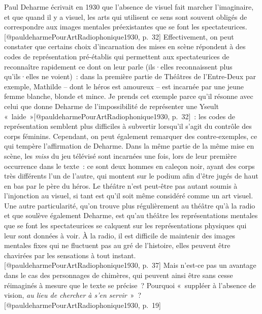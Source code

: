 \documentclass[
]{article}
\begin{document}
Paul Deharme écrivait en 1930 que l'absence de visuel fait marcher l'imaginaire, et que quand il y a visuel, les arts qui utilisent ce sens sont souvent obligés de correspondre aux images mentales préexistantes que se font les spectateurices.{[}@pauldeharmePourArtRadiophonique1930, p.~32{]} Effectivement, on peut constater que certains choix d'incarnation des mises en scène répondent à des codes de représentation pré-établis qui permettent aux spectateurices de reconnaître rapidement ce dont on leur parle (ils·elles reconnaissent plus qu'ils·elles ne voient)~: dans la première partie de Théâtres de l'Entre-Deux par exemple, Mathilde -- dont le héros est amoureux -- est incarnée par une jeune femme blanche, blonde et mince. Je prends cet exemple parce qu'il résonne avec celui que donne Deharme de l'impossibilité de représenter une Yseult «~laide~»{[}@pauldeharmePourArtRadiophonique1930, p.~32{]}~: les codes de représentation semblent plus difficiles à subvertir lorsqu'il s'agit du contrôle des corps féminins. Cependant, on peut également remarquer des contre-exemples, ce qui tempère l'affirmation de Deharme. Dans la même partie de la même mise en scène, les \emph{miss} du jeu télévisé sont incarnées une fois, lors de leur première occurrence dans le texte~: ce sont deux hommes en caleçon noir, ayant des corps très différents l'un de l'autre, qui montent sur le podium afin d'être jugés de haut en bas par le père du héros. Le théâtre n'est peut-être pas autant soumis à l'injonction au visuel, si tant est qu'il soit même considéré comme un art visuel. Une autre particularité, qu'on trouve plus régulièrement au théâtre qu'à la radio et que soulève également Deharme, est qu'au théâtre les représentations mentales que se font les spectateurices se calquent sur les représentations physiques qui leur sont données à voir. À la radio, il est difficile de maintenir des images mentales fixes qui ne fluctuent pas au gré de l'histoire, elles peuvent être chavirées par les sensations à tout instant.{[}@pauldeharmePourArtRadiophonique1930, p.~37{]} Mais n'est-ce pas un avantage dans le cas des personnages de chimères, qui peuvent ainsi être sans cesse réimaginés à mesure que le texte se précise~? Pourquoi «~suppléer à l'absence de vision, \emph{au lieu de chercher à s'en servir}~»~?{[}@pauldeharmePourArtRadiophonique1930, p.~19{]}
\end{document}
